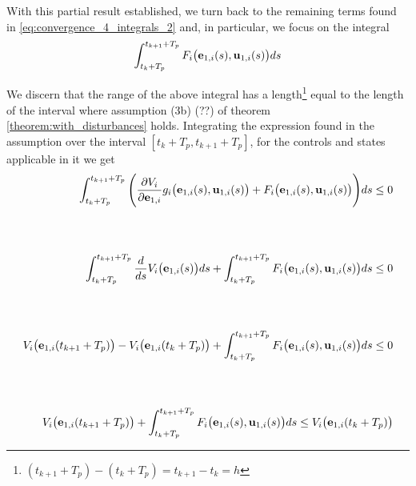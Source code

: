 With this partial result established, we turn back to the remaining terms
found in \eqref{eq:convergence_4_integrals_2} and, in particular, we focus on
the integral
\begin{align}
  \int_{t_k + T_p}^{t_{k+1} + T_p} F_i \big(\bm{\mathbf{e}}_{1,i}(s), \bm{\mathbf{u}}_{1,i} (s)\big) d s
\end{align}
\begin{gg_box}
  We discern that the range of the above integral has a length\footnote{$(t_{k+1} + T_p) - (t_k + T_p) = t_{k+1} - t_k = h$}
  equal to the length of the interval where assumption (3b) (??) of theorem
  \eqref{theorem:with_disturbances} holds.
  Integrating the expression found in the assumption over the
  interval $[t_k + T_p, t_{k+1} + T_p]$, for the controls and states applicable
  in it we get
  \begin{align}
    \int_{t_k + T_p}^{t_{k+1} + T_p} \Bigg(\dfrac{\partial V_i}{\partial \bm{\mathbf{e}}_{1,i}} g_i\big(\bm{\mathbf{e}}_{1,i}(s), \bm{\mathbf{u}}_{1,i}(s)\big)
    + F_i\big(\bm{\mathbf{e}}_{1,i}(s), \bm{\mathbf{u}}_{1,i}(s)\big)\Bigg) ds \leq 0 \\[2.5ex]\\[2.5ex]
    \int_{t_k + T_p}^{t_{k+1} + T_p} \dfrac{d}{ds} V_i\big(\bm{\mathbf{e}}_{1,i}(s)\big) d s
    + \int_{t_k + T_p}^{t_{k+1} + T_p} F_i\big(\bm{\mathbf{e}}_{1,i}(s), \bm{\mathbf{u}}_{1,i}(s)\big) ds \leq 0 \\[2.5ex]\\[2.5ex]
    V_i\big(\bm{\mathbf{e}}_{1,i}(t_{k+1} + T_p)\big) - V_i\big(\bm{\mathbf{e}}_{1,i}(t_k + T_p)\big)
    + \int_{t_k + T_p}^{t_{k+1} + T_p} F_i\big(\bm{\mathbf{e}}_{1,i}(s), \bm{\mathbf{u}}_{1,i}(s)\big) ds \leq 0 \\[2.5ex]\\[2.5ex]
    V_i\big(\bm{\mathbf{e}}_{1,i}(t_{k+1} + T_p)\big)
    + \int_{t_k + T_p}^{t_{k+1} + T_p} F_i\big(\bm{\mathbf{e}}_{1,i}(s), \bm{\mathbf{u}}_{1,i}(s)\big) ds \leq V_i\big(\bm{\mathbf{e}}_{1,i}(t_k + T_p)\big)
  \end{align}


\end{gg_box}
